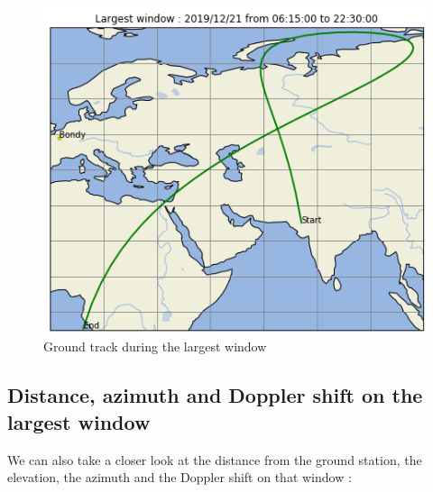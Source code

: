\documentclass[a4paper,12pt,calibri,oneside,openany]{book}
\theoremstyle{break}
\begin{document}
\begin{figure}[H]
	\centering
	\includegraphics[width=\linewidth]{window}
	\caption{Ground track during the largest window}
\end{figure}
\newpage
\subsection{Distance, azimuth and Doppler shift on the largest window}
We can also take a closer look at the distance from the ground station, the elevation, the azimuth and the Doppler shift on that window :
\end{document}
